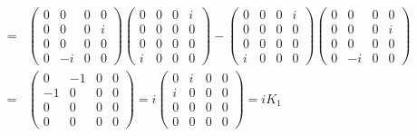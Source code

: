 \documentclass[11pt]{article}
\begin{document}
\begin{eqnarray}
    [J_2,K_3]&=&
    \begin{pmatrix}
        0 & 0 & 0 & 0 \\
        0 & 0 & 0 & i \\
        0 & 0 & 0 & 0 \\
        0 & -i & 0 & 0 
    \end{pmatrix}
    \begin{pmatrix}
        0 & 0 & 0 & i \\
        0 & 0 & 0 & 0 \\
        0 & 0 & 0 & 0 \\
        i & 0 & 0 & 0 
    \end{pmatrix}
    -
    \begin{pmatrix}
        0 & 0 & 0 & i \\
        0 & 0 & 0 & 0 \\
        0 & 0 & 0 & 0 \\
        i & 0 & 0 & 0 
    \end{pmatrix}
    \begin{pmatrix}
        0 & 0 & 0 & 0 \\
        0 & 0 & 0 & i \\
        0 & 0 & 0 & 0 \\
        0 & -i & 0 & 0 
    \end{pmatrix} \\
    &=&
    \begin{pmatrix}
        0 & -1 & 0 & 0\\ 
        -1 & 0 & 0 & 0 \\
        0 & 0 & 0 & 0 \\
        0 & 0 & 0 & 0 
    \end{pmatrix}
    =i
    \begin{pmatrix}
        0 & i & 0 & 0\\ 
        i & 0 & 0 & 0 \\
        0 & 0 & 0 & 0 \\
        0 & 0 & 0 & 0 
    \end{pmatrix}
    =iK_1
\end{eqnarray}
\end{document}
